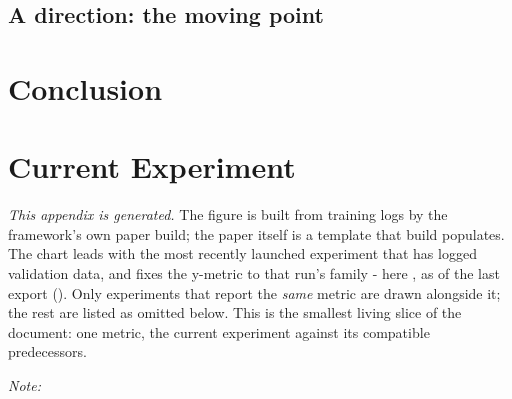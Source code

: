 \subsection{A direction: the moving point}

\begingroup
\renewcommand{\qedsymbol}{}
\paperFramingConclusion
\endgroup

\section{Conclusion}

\paperThreadConclusion

\appendix

\section{Current Experiment}
\label{sec:current}

\emph{This appendix is generated.} The figure is built from training logs by the framework's own paper build; the paper itself is a template that build populates. The chart leads with the most recently launched experiment that has logged validation data, and fixes the y-metric to that run's family - here \paperMetricName{}, as of the last export (\paperUpdated). Only experiments that report the \emph{same} metric are drawn alongside it; the rest are listed as omitted below. This is the smallest living slice of the document: one metric, the current experiment against its compatible predecessors.

\ifx\paperCurrentNote\empty\else
    \par\smallskip\noindent\emph{Note:} \paperCurrentNote
\fi

